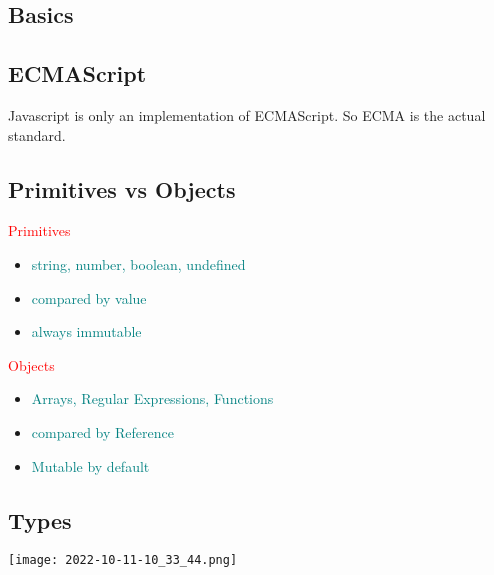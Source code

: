 \documentclass[main.tex,fontsize=6pt,paper=a4,paper=landscape,DIV=calc,]{scrartcl}
\begin{document}
\begin{multicols*}{4}

\section{Basics}

\subsection{ECMAScript} 
Javascript is only an implementation of ECMAScript. So ECMA is the actual standard.
 
\subsection{Primitives vs Objects}  
\textcolor{red}{Primitives}

\begin{itemize}
  \item \textcolor{teal}{string, number, boolean, undefined}
  \item \textcolor{teal}{compared by value}
  \item \textcolor{teal}{always immutable}
\end{itemize}
\vspace{2mm}
\textcolor{red}{Objects}
\begin{itemize}
  \item \textcolor{teal}{Arrays, Regular Expressions, Functions}
  \item \textcolor{teal}{compared by Reference}
  \item \textcolor{teal}{Mutable by default}
  
\end{itemize}


\subsection{Types} 
\texttt{[image: 2022-10-11-10\_33\_44.png]}


\end{multicols*}
\end{document}
